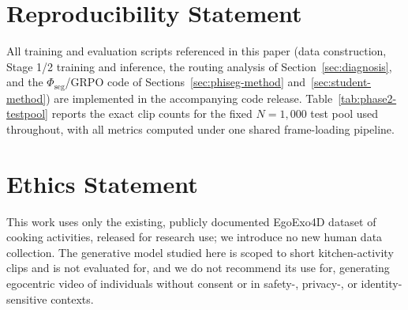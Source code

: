 \documentclass{article} %
\begin{document}
\section*{Reproducibility Statement}
All training and evaluation scripts referenced in this paper (data
construction, Stage 1/2 training and
inference, the routing analysis of Section~\ref{sec:diagnosis}, and the
$\Phi_{\text{seg}}$/GRPO code of Sections~\ref{sec:phiseg-method}
and~\ref{sec:student-method}) are implemented in
the accompanying code release. Table~\ref{tab:phase2-testpool} reports the exact
clip counts for the fixed $N=1{,}000$ test pool used throughout,
with all metrics computed under one shared frame-loading pipeline.

\section*{Ethics Statement}
This work uses only the existing, publicly documented EgoExo4D dataset of
cooking activities, released for research use; we introduce no new human
data collection. The generative model studied here is scoped to short
kitchen-activity clips and is not evaluated for, and we do not recommend its
use for, generating egocentric video of individuals without consent or in
safety-, privacy-, or identity-sensitive contexts.
\end{document}
